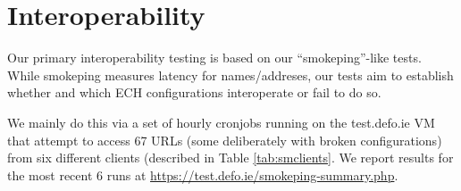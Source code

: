 \section{Interoperability}

Our primary interoperability testing is based on our ``smokeping''-like tests.
While smokeping measures latency for names/addreses, our tests aim to establish
whether and which ECH configurations interoperate or fail to do so.

We mainly do this via a set of hourly cronjobs running on the test.defo.ie VM
that attempt to access 67 URLs (some deliberately with broken configurations)
from six different clients (described in Table \ref{tab:smclients}. We report
results for the most recent 6 runs at
\url{https://test.defo.ie/smokeping-summary.php}.

\small
